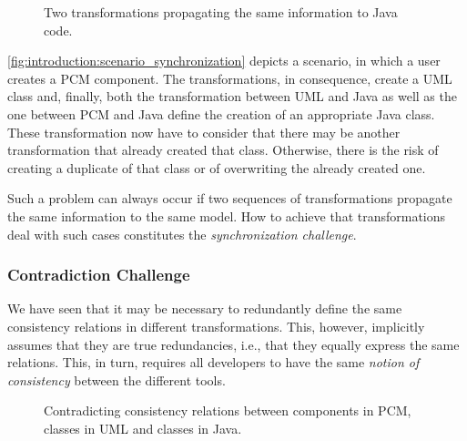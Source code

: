 \begin{figure}
    \centering
    
    \caption[Example for transformation synchronization]{Two transformations propagating the same information to Java code.}
    \label{fig:introduction:scenario_synchronization}
\end{figure}

\autoref{fig:introduction:scenario_synchronization} depicts a scenario, in which a user creates a \gls{PCM} component.
The transformations, in consequence, create a \gls{UML} class and, finally, both the transformation between \gls{UML} and Java as well as the one between \gls{PCM} and Java define the creation of an appropriate Java class.
These transformation now have to consider that there may be another transformation that already created that class.
Otherwise, there is the risk of creating a duplicate of that class or of overwriting the already created one.

Such a problem can always occur if two sequences of transformations propagate the same information to the same model. %
How to achieve that transformations deal with such cases constitutes the \emph{synchronization challenge}.

\subsubsection*{Contradiction Challenge}

We have seen that it may be necessary to redundantly define the same consistency relations in different transformations.
This, however, implicitly assumes that they are true redundancies, i.e., that they equally express the same relations.
This, in turn, requires all developers to have the same \emph{notion of consistency} between the different tools.

\begin{figure}
    \centering
    
    \caption[Example for transformation contradictions]{Contradicting consistency relations between components in \gls{PCM}, classes in \gls{UML} and classes in Java.}
    \label{fig:introduction:scenario_contradiction}
\end{figure}

